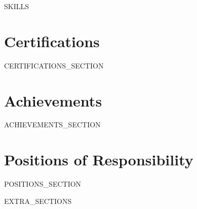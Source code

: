 \documentclass[a4paper,10pt]{article}
\begin{document}
{{SKILLS}}

\section{Certifications}

{{CERTIFICATIONS_SECTION}}

\section{Achievements}

{{ACHIEVEMENTS_SECTION}}

\section{Positions of Responsibility}

{{POSITIONS_SECTION}}

{{EXTRA_SECTIONS}}

\vfill
{}
\end{document}
